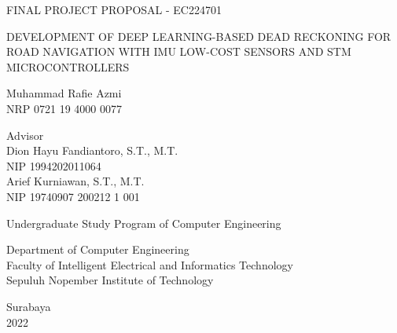 \begin{large}
  FINAL PROJECT PROPOSAL - EC224701
\end{large}

\vspace{\fill}

\begin{spacing}{1.5}
  \begin{Large}
    DEVELOPMENT OF DEEP LEARNING-BASED DEAD RECKONING 
    FOR ROAD NAVIGATION 
    WITH IMU LOW-COST SENSORS AND STM MICROCONTROLLERS
  \end{Large}
\end{spacing}

\vspace{\fill}

\begin{large}
  Muhammad Rafie Azmi \\
  \textmd{NRP 0721 19 4000 0077}
\end{large}

\vspace{\fill}

\begin{large}
  \textmd{Advisor} \\
  Dion Hayu Fandiantoro, S.T., M.T. \\
  \textmd{NIP 1994202011064} \\
  Arief Kurniawan, S.T., M.T. \\
  \textmd{NIP 19740907 200212 1 001}
\end{large}

\vspace{\fill}

Undergraduate Study Program of Computer Engineering \\

\mdseries

Department of Computer Engineering \\
Faculty of Intelligent Electrical and Informatics Technology \\
Sepuluh Nopember Institute of Technology

Surabaya \\
2022

